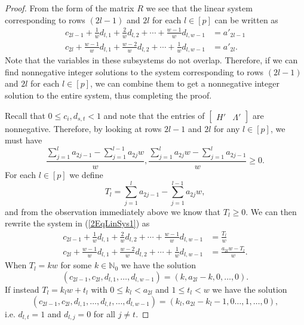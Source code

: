 \documentclass [12pt,a4paper,reqno]{amsart}
\theoremstyle{plain}
\theoremstyle{definition}
\newtheorem{Assumptions and Discussion}[Theorem]{Assumptions and Discussion}
\theoremstyle{remark}
\begin{document}
\begin{proof}
From the form of the matrix $R$ we see that the linear system corresponding to rows $(2l-1)$ and $2l$ for each $l\in[p]$ can be written as 
\begin{align}\label{2EqLinSys1}
c_{2l-1} + \frac{1}{w}d_{l,1} + \frac{2}{w}d_{l,2} + \cdots + \frac{w-1}{w}d_{l,w-1} 
    &= a'_{2l-1}\nonumber \\
c_{2l} + \frac{w-1}{w}d_{l,1} + \frac{w-2}{w}d_{l,2} + \cdots + \frac{1}{w}d_{l,w-1} &= a'_{2l}.
\end{align}
Note that the variables in these subsystems do not overlap. Therefore, if we can find nonnegative integer solutions to the system corresponding to rows $(2l-1)$ and $2l$ for each $l\in[p]$, we can combine them to get a nonnegative integer solution to the entire system, thus completing the proof. 

Recall that $0\leq c_i,d_{s,t}<1$ and note that the entries of $\begin{bmatrix}H' & \Lambda'\end{bmatrix}$ are nonnegative. Therefore, by looking at rows $2l-1$ and $2l$ for any $l\in [p]$, we must have 
\[\frac{{\textstyle \sum_{j=1}^{l}a_{2j-1}-\sum_{j=1}^{l-1}a_{2j}w}}{w}, \frac{{\textstyle \sum_{j=1}^{l}a_{2j}w-\sum_{j=1}^{l}a_{2j-1}}}{w} \ge 0.\] 
For each $l\in[p]$ we define 
\[T_l=\sum_{j=1}^{l}a_{2j-1}-\sum_{j=1}^{l-1}a_{2j}w,\] and from the observation immediately above we know that \(T_l \ge 0\). We can then rewrite the system in (\ref{2EqLinSys1}) as 
\begin{align}\label{2EqLinSys2}
c_{2l-1} + \frac{1}{w}d_{l,1} + \frac{2}{w}d_{l,2} + \cdots + \frac{w-1}{w}d_{l,w-1} 
    &= \frac{T_{l}}{w}\nonumber \\
c_{2l} + \frac{w-1}{w}d_{l,1} + \frac{w-2}{w}d_{l,2} + \cdots + \frac{1}{w}d_{l,w-1} &= \frac{a_{2l}w - T_{l}}{w}.
\end{align}
When $T_{l}=kw$ for some $k\in\mathbb{N}_0$ we have the solution 
\[(c_{2l-1}, c_{2l}, d_{l,1}, \dots, d_{l,w-1})=(k,a_{2l}-k,0,\dots,0).\] 
If instead \(T_{l}=k_lw+t_l\) with \(0\le k_l< a_{2l}\) and  $1\le t_l < w$ we have the solution 
\[
(c_{2l-1}, c_{2l}, d_{l,1}, \dots,d_{l,t},\dots, d_{l,w-1})=\left(k_l,a_{2l}-k_l-1,0\dots,1,\dots,0\right),
\]
i.e. $d_{l,t}=1$ and $d_{l,j}=0$ for all $j\neq t$.  
\end{proof}
\end{document}
